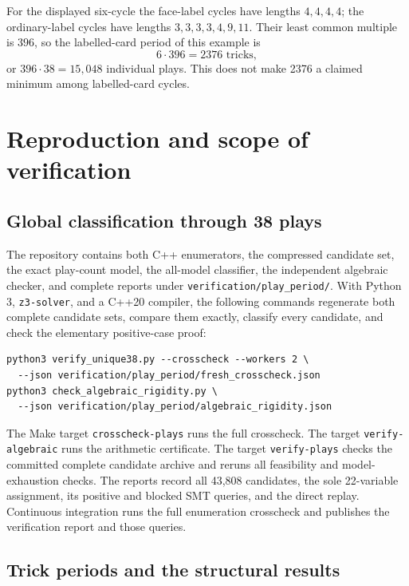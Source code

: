 \documentclass[11pt]{article}
\newcommand{\word}[1]{\texttt{#1}}
\begin{document}
For the displayed six-cycle the face-label cycles have lengths $4,4,4,4$;
the ordinary-label cycles have lengths $3,3,3,3,4,9,11$. Their least common
multiple is $396$, so the labelled-card period of this example is
\[
6\cdot396=2376\text{ tricks},
\]
or $396\cdot38=15{,}048$ individual plays. This does not make 2376 a claimed
minimum among labelled-card cycles.

\section{Reproduction and scope of verification}\label{sec:reproduction}

\subsection{Global classification through 38 plays}

The repository contains both C++ enumerators, the compressed candidate set,
the exact play-count model, the all-model classifier, the independent
algebraic checker, and complete reports under
\word{verification/play\_period/}. With Python 3, \word{z3-solver}, and a
C++20 compiler, the following commands regenerate both complete candidate
sets, compare them exactly, classify every candidate, and check the
elementary positive-case proof:
\begin{verbatim}
python3 verify_unique38.py --crosscheck --workers 2 \
  --json verification/play_period/fresh_crosscheck.json
python3 check_algebraic_rigidity.py \
  --json verification/play_period/algebraic_rigidity.json
\end{verbatim}
The Make target \word{crosscheck-plays} runs the full crosscheck.
The target \word{verify-algebraic} runs the arithmetic certificate.
The target \word{verify-plays} checks the committed
complete candidate archive and reruns all feasibility and model-exhaustion
checks. The reports record all 43,808 candidates, the sole 22-variable
assignment, its positive and blocked SMT queries, and the direct replay.
Continuous integration runs the full enumeration crosscheck and publishes
the verification report and those queries.

\subsection{Trick periods and the structural results}
\end{document}
